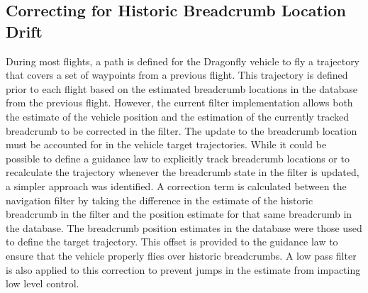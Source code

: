\subsection{Correcting for Historic Breadcrumb Location Drift}

During most flights, a path is defined for the Dragonfly vehicle to fly a trajectory that covers a set of waypoints from a previous flight.  This trajectory is defined prior to each flight based on the estimated breadcrumb locations in the database from the previous flight.  However, the current filter implementation allows both the estimate of the vehicle position and the estimation of the currently tracked breadcrumb to be corrected in the filter.  The update to the breadcrumb location must be accounted for in the vehicle target trajectories.  While it could be possible to define a guidance law to explicitly track breadcrumb locations or to recalculate the trajectory whenever the breadcrumb state in the filter is updated, a simpler approach was identified.  A correction term is calculated between the navigation filter by taking the difference in the estimate of the historic breadcrumb in the filter and the position estimate for that same breadcrumb in the database.  The breadcrumb position estimates in the database were those used to define the target trajectory. This offset is provided to the guidance law to ensure that the vehicle properly flies over historic breadcrumbs.  A low pass filter is also applied to this correction to prevent jumps in the estimate from impacting low level control.  